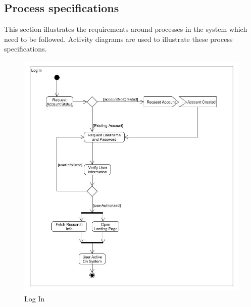 \documentclass[a4paper,12pt]{article}
\begin{document}
\newpage
\subsection{Process specifications}

This section illustrates the requirements around processes in the system which need to be followed. Activity diagrams are used to illustrate these process specifications.

\begin{figure}[H]
    \centering
    \caption{Log In}
    \includegraphics[width=1\textwidth]{process-spec/Activity_Login.jpg}
\end{figure}
\end{document}
